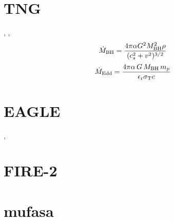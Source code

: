 \documentclass[11pt,a4paper]{article}
\begin{document}
\section{TNG}
\citet{Weinberger2017}, 
\citet{Weinberger2017b}, 
\citet{Pillepich2017}
\citet{Pillepich2018}
\begin{equation}
  \dot{M}_{\rm BH} = \frac{4 \pi \alpha G^2 M_{\rm BH}^2 \rho}{(c^2_s + v^2)^{3/2}} 
\end{equation}
\begin{equation}
  \dot{M}_{\rm Edd} = \frac{4 \pi \alpha \, G \, M_{\rm BH} \, m_{p}}{\epsilon_{\rm r} \sigma_{\rm T} c  }
\end{equation}

\section{EAGLE}
\citet{Schaye2015}, 
\citet{Crain2015}

\section{FIRE-2}


\section{{\sc mufasa}}
\end{document}
